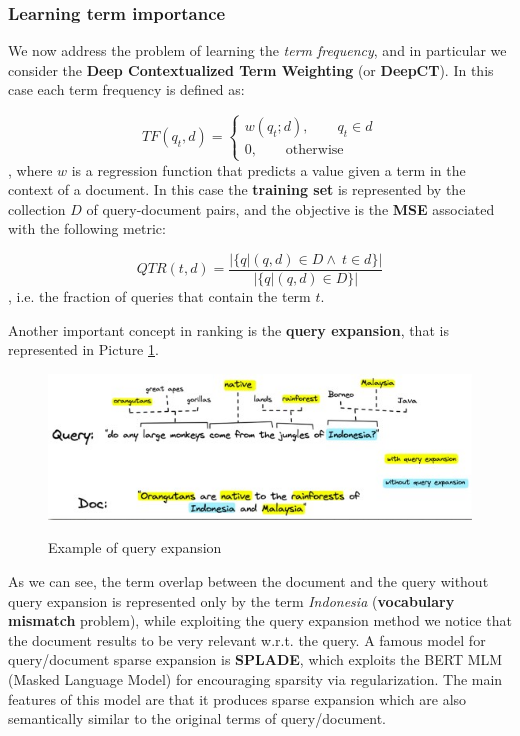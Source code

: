 \subsubsection{Learning term importance}
We now address the problem of learning the \textit{term frequency}, and in particular we consider the \textbf{Deep Contextualized Term Weighting} (or \textbf{DeepCT}). In this case each term frequency is defined as:

$$
TF(q_t, d) = \begin{cases}
    w(q_t; d), \qquad q_t \in d \\
    0, \qquad \text{otherwise}
\end{cases}
$$
, where $w$ is a regression function that predicts a value given a term in the context of a document. In this case the \textbf{training set} is represented by the collection $D$ of query-document pairs, and the objective is the \textbf{MSE} associated with the following metric:

$$
QTR(t,d) = \frac{|\{ q | (q,d) \in D \land \ t \in d \}|}{|\{ q | (q,d) \in D \}|} 
$$
, i.e. the fraction of queries that contain the term $t$.

Another important concept in ranking is the \textbf{query expansion}, that is represented in Picture \ref{query exp}.

\begin{figure}[h!]
		\centering
		\includegraphics[scale = 1.8]{img/query expansion.jpg}
        \label{query exp}
        \caption{Example of query expansion}
\end{figure}

As we can see, the term overlap between the document and the query without query expansion is represented only by the term \textit{Indonesia} (\textbf{vocabulary mismatch} problem), while exploiting the query expansion method we notice that the document results to be very relevant w.r.t. the query. A famous model for query/document sparse expansion is \textbf{SPLADE}, which exploits the BERT MLM (Masked Language Model) for encouraging sparsity via regularization. The main features of this model are that it produces sparse expansion which are also semantically similar to the original terms of query/document.

